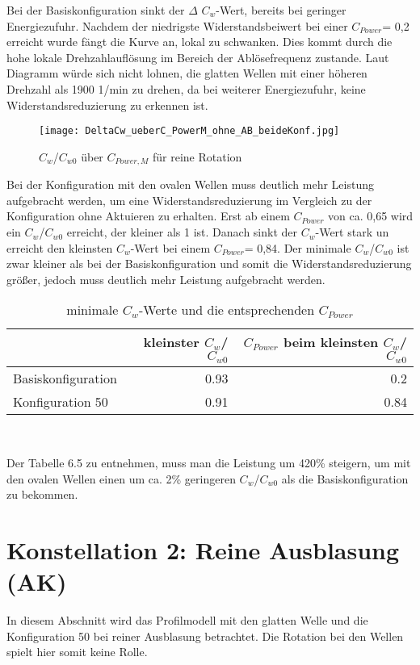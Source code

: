 Bei der Basiskonfiguration sinkt der $\Delta$ $C_{w}$-Wert, bereits bei geringer Energiezufuhr.  Nachdem der niedrigste Widerstandsbeiwert bei einer $C_{Power}$= 0,2 erreicht wurde f\"angt die Kurve an, lokal zu schwanken. Dies kommt durch die hohe lokale Drehzahlaufl\"osung im Bereich der Abl\"osefrequenz zustande. Laut Diagramm w\"urde sich nicht lohnen, die glatten Wellen mit einer h\"oheren Drehzahl als 1900  1/min zu drehen, da bei weiterer Energiezufuhr, keine Widerstandsreduzierung zu erkennen ist.
\begin{figure}[h]
	\centering
	\texttt{[image: DeltaCw\_ueberC\_PowerM\_ohne\_AB\_beideKonf.jpg]}
	\caption{ $C_{w}$/$C_{w0}$ \"uber $C_{Power,M}$ f\"ur reine Rotation  }
	\label{fig:Cw-Cw0-CpowerM_reine}
\end{figure}
Bei der Konfiguration mit den ovalen Wellen muss deutlich mehr Leistung aufgebracht werden, um eine Widerstandsreduzierung im Vergleich zu der Konfiguration ohne Aktuieren zu erhalten.  Erst ab einem $C_{Power}$ von ca. 0,65 wird ein $C_{w}$/$C_{w0}$ erreicht, der kleiner als 1 ist. 
Danach sinkt der $C_{w}$-Wert stark un erreicht den kleinsten $C_{w}$-Wert bei einem $C_{Power}$= 0,84. 
Der minimale $C_{w}$/$C_{w0}$ ist zwar kleiner als bei der Basiskonfiguration und somit die Widerstandsreduzierung gr\"o\ss{}er, jedoch muss deutlich mehr Leistung aufgebracht werden.
\begin{table}[h]
	\centering
	\begin{tabular}{lrr}
		\toprule
		 & kleinster  $C_{w}$/$C_{w0}$ & $C_{Power}$ beim kleinsten $C_{w}$/$C_{w0}$ \\
		\midrule
		Basiskonfiguration & 0.93 & 0.2\\
		Konfiguration 50 & 0.91 & 0.84\\
		\bottomrule
	\end{tabular}\\
	\caption{ minimale  $C_{w}$-Werte und die entsprechenden $C_{Power}$ }
	\label{tab:minimalCw-Cpower}
\end{table}
Der Tabelle 6.5 zu entnehmen, muss man die Leistung um 420\% steigern, um mit den ovalen Wellen einen um ca. 2\% geringeren $C_{w}$/$C_{w0}$ als die Basiskonfiguration zu bekommen.


\section{Konstellation 2: Reine Ausblasung (AK)}
\label{s:reineAusblasung}
In diesem Abschnitt wird das Profilmodell mit den glatten Welle und die Konfiguration 50 bei reiner Ausblasung betrachtet. Die Rotation bei den Wellen spielt hier somit keine Rolle. 

